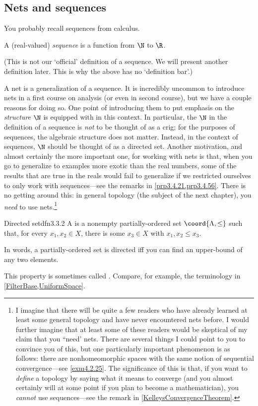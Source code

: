 \subsection{Nets and sequences}

You probably recall sequences from calculus.
\begin{textequation}
A (real-valued) \emph{sequence} is a function from $\N$ to $\R$.
\end{textequation}
(This is not our `official' definition of a sequence.  We will present another definition later.  This is why the above has no `definition bar'.)

A net is a generalization of a sequence.  It is incredibly uncommon to introduce nets in a first course on analysis (or even in second course), but we have a couple reasons for doing so.  One point of introducing them to put emphasis on the \emph{structure} $\N$ is equipped with in this context.  In particular, the $\N$ in the definition of a sequence is \emph{not} to be thought of as a crig; for the purposes of sequences, the algebraic structure does not matter.  Instead, in the context of sequences, $\N$ should be thought of as a directed set.  Another motivation, and almost certainly the more important one, for working with nets is that, when you go to generalize to examples more exotic than the real numbers, some of the results that are true in the reals would fail to generalize if we restricted ourselves to only work with sequences---see the remarks in \cref{prp3.4.21,prp3.4.56}.  There is no getting around this:  in general topology (the subject of the next chapter), you \emph{need} to use nets.\footnote{I imagine that there will be quite a few readers who have already learned at least some general topology and have never encountered nets before.  I would further imagine that at least some of these readers would be skeptical of my claim that you ``need' nets.  There are several things I could point to you to convince you of this, but one particularly important phenomenon is as follows:  there are nonhomeomorphic spaces with the same notion of sequential convergence---see \cref{exm4.2.25}.  The significance of this is that, if you want to \emph{define} a topology by saying what it means to converge (and you almost certainly will at some point if you plan to become a mathematician), you \emph{cannot} use sequences---see the remark in \cref{KelleysConvergenceTheorem}.}
\begin{dfn}{Directed set}{dfn3.3.2}
A  is a nonempty partially-ordered set $\coord{\Lambda ,\leq}$ such that, for every $x_1,x_2\in X$, there is some $x_3\in X$ with $x_1,x_2\leq x_3$.
\begin{rmk}
In words, a partially-ordered set is directed iff you can find an upper-bound of any two elements.
\end{rmk}
\begin{rmk}
This property is sometimes called .  Compare, for example, the terminology in \cref{FilterBase,UniformSpace}.
\end{rmk}
\end{dfn}
